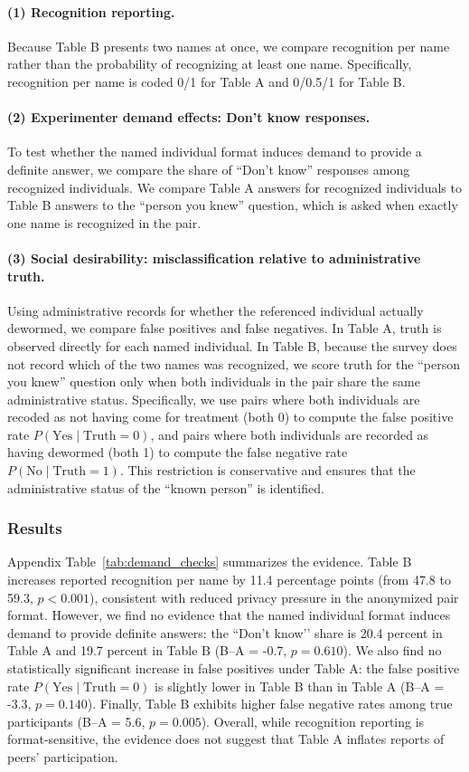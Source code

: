 \documentclass[12pt,a4paper]{article}
\begin{document}
\paragraph{(1) Recognition reporting.}
Because Table B presents two names at once, we compare recognition per name rather than the probability of recognizing at least one name. Specifically, recognition per name is coded 0/1 for Table A and 0/0.5/1 for Table B.

\paragraph{(2) Experimenter demand effects: Don't know responses.}
To test whether the named individual format induces demand to provide a definite answer, we compare the share of ``Don't know'' responses among recognized individuals. We compare Table A answers for recognized individuals to Table B answers to the ``person you knew'' question, which is asked when exactly one name is recognized in the pair.

\paragraph{(3) Social desirability: misclassification relative to administrative truth.}
Using administrative records for whether the referenced individual actually dewormed, we compare false positives and false negatives. In Table A, truth is observed directly for each named individual. In Table B, because the survey does not record which of the two names was recognized, we score truth for the ``person you knew'' question only when both individuals in the pair share the same administrative status. Specifically, we use pairs where both individuals are recoded as not having come for treatment (both 0) to compute the false positive rate $P(\text{Yes}\mid\text{Truth}=0)$, and pairs where both individuals are recorded as having dewormed (both 1) to compute the false negative rate $P(\text{No}\mid\text{Truth}=1)$. This restriction is conservative and ensures that the administrative status of the ``known person'' is identified.

\subsubsection*{Results}
Appendix Table~\ref{tab:demand_checks} summarizes the evidence. Table B increases reported recognition per name by 11.4 percentage points (from 47.8 to 59.3, $p <0.001$), consistent with reduced privacy pressure in the anonymized pair format. However, we find no evidence that the named individual format induces demand to provide definite answers: the ``Don't know’’ share is 20.4 percent in Table A and 19.7 percent in Table B (B--A = -0.7, $p=0.610$). We also find no statistically significant increase in false positives under Table A: the false positive rate $P(\text{Yes}\mid\text{Truth}=0)$ is slightly lower in Table B than in Table A (B--A = -3.3, $p=0.140$). Finally, Table B exhibits higher false negative rates among true participants (B--A = 5.6, $p=0.005$). Overall, while recognition reporting is format-sensitive, the evidence does not suggest that Table A inflates reports of peers' participation.
\end{document}
